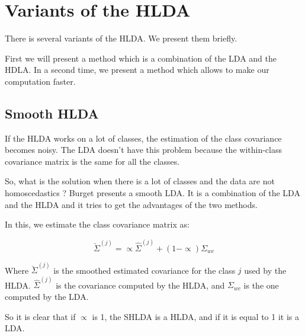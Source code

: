 
\section{Variants of the HLDA}
\label{sec:variants}

There is several variants of the HLDA. We present them briefly.

First we will present a method which is a combination of the LDA and
the HDLA. In a second time, we present a method which allows to make our
computation faster.

\subsection{Smooth HLDA}
\label{sec:smooth-hlda}

If the HLDA works on a lot of classes, the estimation of the class
covariance becomes noisy. The LDA doesn't have this problem because
the within-class covariance matrix is the same for all the classes.

So, what is the solution when there is a lot of classes and the data
are not homoscedastics ? Burget\cite{burget.2004} presents a smooth
LDA. It is a combination of the LDA and the HLDA and it tries to get
the advantages of the two methods.

In this, we estimate the class covariance matrix as:

$$\breve\Sigma^{\left( j\right) }=\propto \hat\Sigma^{\left( j\right) } +\left( 1- \propto\right) \Sigma_{wc}$$

Where $\breve\Sigma^{\left( j\right) }$ is the smoothed estimated
covariance for the class $j$ used by the HLDA.
$\hat\Sigma^{\left(j\right) }$ is the covariance computed by the HLDA, and
$\Sigma_{wc}$ is the one computed by the LDA.

So it is clear that if $\propto$ is 1, the SHLDA is a HLDA, and if it
is equal to 1 it is a LDA.

